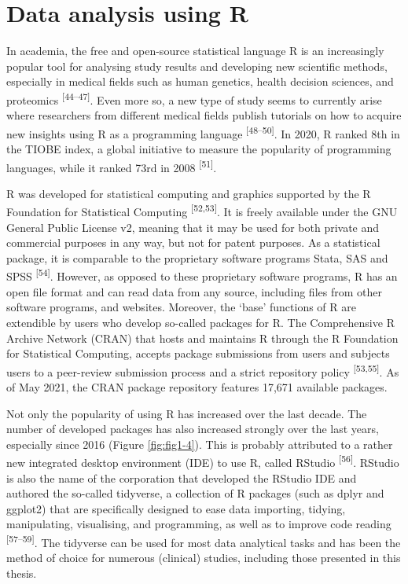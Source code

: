\documentclass[
]{book}
\begin{document}
\hypertarget{data-analysis-using-r}{%
\section{Data analysis using R}\label{data-analysis-using-r}}

In academia, the free and open-source statistical language R is an increasingly popular tool for analysing study results and developing new scientific methods, especially in medical fields such as human genetics, health decision sciences, and proteomics \textsuperscript{{[}44--47{]}}. Even more so, a new type of study seems to currently arise where researchers from different medical fields publish tutorials on how to acquire new insights using R as a programming language \textsuperscript{{[}48--50{]}}. In 2020, R ranked 8th in the TIOBE index, a global initiative to measure the popularity of programming languages, while it ranked 73rd in 2008 \textsuperscript{{[}51{]}}.

R was developed for statistical computing and graphics supported by the R Foundation for Statistical Computing \textsuperscript{{[}52,53{]}}. It is freely available under the GNU General Public License v2, meaning that it may be used for both private and commercial purposes in any way, but not for patent purposes. As a statistical package, it is comparable to the proprietary software programs Stata, SAS and SPSS \textsuperscript{{[}54{]}}. However, as opposed to these proprietary software programs, R has an open file format and can read data from any source, including files from other software programs, and websites. Moreover, the `base' functions of R are extendible by users who develop so-called packages for R. The Comprehensive R Archive Network (CRAN) that hosts and maintains R through the R Foundation for Statistical Computing, accepts package submissions from users and subjects users to a peer-review submission process and a strict repository policy \textsuperscript{{[}53,55{]}}. As of May 2021, the CRAN package repository features 17,671 available packages.

Not only the popularity of using R has increased over the last decade. The number of developed packages has also increased strongly over the last years, especially since 2016 (Figure \ref{fig:fig1-4}). This is probably attributed to a rather new integrated desktop environment (IDE) to use R, called RStudio \textsuperscript{{[}56{]}}. RStudio is also the name of the corporation that developed the RStudio IDE and authored the so-called tidyverse, a collection of R packages (such as dplyr and ggplot2) that are specifically designed to ease data importing, tidying, manipulating, visualising, and programming, as well as to improve code reading \textsuperscript{{[}57--59{]}}. The tidyverse can be used for most data analytical tasks and has been the method of choice for numerous (clinical) studies, including those presented in this thesis.
\end{document}
